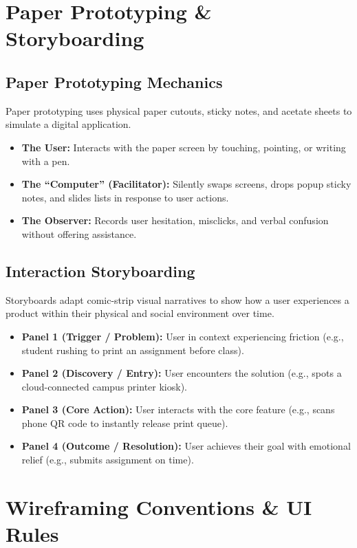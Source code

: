\section{Paper Prototyping \& Storyboarding}

\subsection{Paper Prototyping Mechanics}
Paper prototyping uses physical paper cutouts, sticky notes, and acetate sheets to simulate a digital application.
\begin{itemize}[leftmargin=1.2em, itemsep=3pt]
    \item \textbf{The User:} Interacts with the paper screen by touching, pointing, or writing with a pen.
    \item \textbf{The ``Computer'' (Facilitator):} Silently swaps screens, drops popup sticky notes, and slides lists in response to user actions.
    \item \textbf{The Observer:} Records user hesitation, misclicks, and verbal confusion without offering assistance.
\end{itemize}

\subsection{Interaction Storyboarding}
Storyboards adapt comic-strip visual narratives to show how a user experiences a product within their physical and social environment over time.
\begin{itemize}[leftmargin=1.2em, itemsep=2pt]
    \item \textbf{Panel 1 (Trigger / Problem):} User in context experiencing friction (e.g., student rushing to print an assignment before class).
    \item \textbf{Panel 2 (Discovery / Entry):} User encounters the solution (e.g., spots a cloud-connected campus printer kiosk).
    \item \textbf{Panel 3 (Core Action):} User interacts with the core feature (e.g., scans phone QR code to instantly release print queue).
    \item \textbf{Panel 4 (Outcome / Resolution):} User achieves their goal with emotional relief (e.g., submits assignment on time).
\end{itemize}

\section{Wireframing Conventions \& UI Rules}

